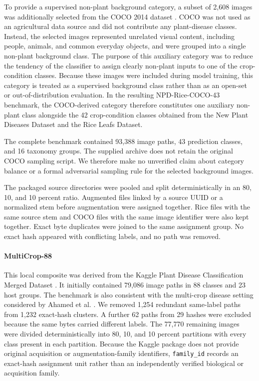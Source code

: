 \documentclass[preprint,12pt]{elsarticle}
\begin{document}
To provide a supervised non-plant background category, a subset of 2,608 images
was additionally selected from the COCO 2014 dataset
\cite{lin2014,coco2014kaggle}. COCO was not used as an agricultural data source
and did not contribute any plant-disease classes. Instead, the selected images
represented unrelated visual content, including people, animals, and common
everyday objects, and were grouped into a single non-plant background class.
The purpose of this auxiliary category was to reduce the tendency of the
classifier to assign clearly non-plant inputs to one of the crop-condition
classes. Because these images were included during model training, this
category is treated as a supervised background class rather than as an open-set
or out-of-distribution evaluation. In the resulting NPD-Rice-COCO-43 benchmark,
the COCO-derived category therefore constitutes one auxiliary non-plant class
alongside the 42 crop-condition classes obtained from the New Plant Diseases
Dataset and the Rice Leafs Dataset.

The complete benchmark contained 93,388 image paths, 43 prediction classes,
and 16 taxonomy groups. The supplied archive does not retain the original COCO
sampling script. We therefore make no unverified claim about category balance
or a formal adversarial sampling rule for the selected background images.

The packaged source directories were pooled and split deterministically in an
80, 10, and 10 percent ratio. Augmented files linked by a source UUID or a
normalized stem before augmentation were assigned together. Rice files with
the same source stem and COCO files with the same image identifier were also
kept together. Exact byte duplicates were joined to the same assignment group.
No exact hash appeared with conflicting labels, and no path was removed.

\paragraph{MultiCrop-88}
This local composite was derived from the Kaggle Plant Disease Classification
Merged Dataset \cite{dobrovsky_multicrop}. It initially contained 79,086 image
paths in 88 classes and 23 host groups. The benchmark is also consistent with
the multi-crop disease setting considered by Ahamed et al. \cite{ahamed2024}.
We removed 1,254 redundant same-label paths from 1,232 exact-hash clusters. A
further 62 paths from 29 hashes were excluded because the same bytes carried
different labels. The 77,770 remaining images were divided deterministically
into 80, 10, and 10 percent partitions with every class present in each
partition. Because the Kaggle package does not provide original acquisition or
augmentation-family identifiers, \texttt{family\_id} records an exact-hash
assignment unit rather than an independently verified biological or acquisition
family.
\end{document}
